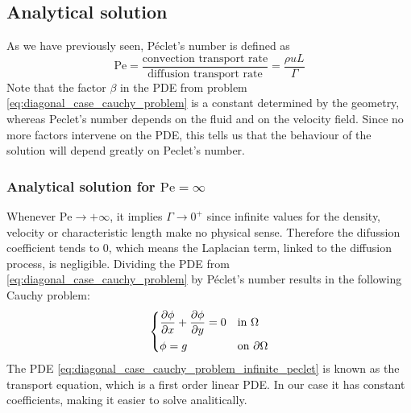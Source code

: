 
\subsection{Analytical solution}

As we have previously seen, Péclet's number is defined as
\begin{equation}
	\mathrm{Pe} = 
	\frac{\text{convection transport rate}}{\text{diffusion transport rate}} = 
	\frac{\rho u L}{\Gamma}
\end{equation}
Note that the factor $\beta$ in the PDE from problem \eqref{eq:diagonal_case_cauchy_problem} is a constant determined by the geometry, whereas Peclet's number depends on the fluid and on the velocity field. Since no more factors intervene on the PDE, this tells us that the behaviour of the solution will depend greatly on Peclet's number. 

\subsubsection{Analytical solution for \texorpdfstring{$\mathrm{Pe} = \infty$}{infinite Péclet's number}}

Whenever $\mathrm{Pe} \to +\infty$, it implies $\Gamma \to 0^+$ since infinite values for the density, velocity or characteristic length make no physical sense. Therefore the difussion coefficient tends to $0$, which means the Laplacian term, linked to the diffusion process, is negligible. Dividing the PDE from \eqref{eq:diagonal_case_cauchy_problem} by Péclet's number results in the following Cauchy problem:
\begin{equation} \label{eq:diagonal_case_cauchy_problem_infinite_peclet}
	\left\{
	\begin{aligned}
		&\pdv{\phi}{x} + \pdv{\phi}{y} = 0 &
		&\text{in } \Omega \\
		&\phi = g &
		&\text{on } \partial \Omega
	\end{aligned}
	\right.
\end{equation}
The PDE \eqref{eq:diagonal_case_cauchy_problem_infinite_peclet} is known as the transport equation, which is a first order linear PDE. In our case it has constant coefficients, making it easier to solve analitically.

